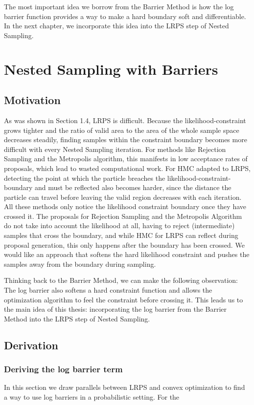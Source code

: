 \documentclass[12pt, a4paper]{report}
\begin{document}
The most important idea we borrow from the Barrier Method is how the log barrier function provides a way to make a hard boundary soft and differentiable.
In the next chapter, we incorporate this idea into the LRPS step of Nested Sampling.


\chapter{Nested Sampling with Barriers}

\section{Motivation}
As was shown in Section 1.4, LRPS is difficult.
Because the likelihood-constraint grows tighter and the ratio of valid area to the area of the whole sample space decreases steadily, finding samples within the constraint boundary becomes more difficult with every Nested Sampling iteration.
For methods like Rejection Sampling and the Metropolis algorithm, this manifests in low acceptance rates of proposals, which lead to wasted computational work.
For HMC adapted to LRPS, detecting the point at which the particle breaches the likelihood-constraint-boundary and must be reflected also becomes harder, since the distance the particle can travel before leaving the valid region decreases with each iteration.
All these methods only notice the likelihood constraint boundary once they have crossed it.
The proposals for Rejection Sampling and the Metropolis Algorithm do not take into account the likelihood at all, having to reject (intermediate) samples that cross the boundary, and while HMC for LRPS can reflect during proposal generation, this only happens after the boundary has been crossed.
We would like an approach that softens the hard likelihood constraint and pushes the samples away from the boundary during sampling.

Thinking back to the Barrier Method, we can make the following observation:
The log barrier also softens a hard constraint function and allows the optimization algorithm to feel the constraint before crossing it.
This leads us to the main idea of this thesis: incorporating the log barrier from the Barrier Method into the LRPS step of Nested Sampling.

\section{Derivation}
\subsection{Deriving the log barrier term}
In this section we draw parallels between LRPS and convex optimization to find a way to use log barriers in a probabilistic setting.
For the 
\end{document}
